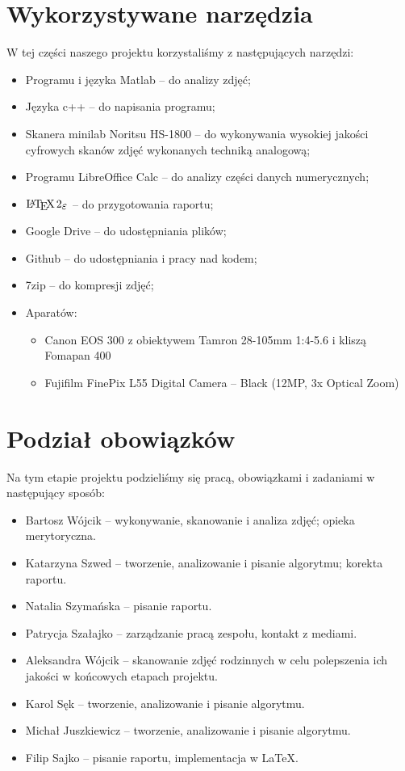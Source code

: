 \documentclass[]{mwart}
\begin{document}
\section{Wykorzystywane narzędzia}
W tej części naszego projektu korzystaliśmy z następujących narzędzi:
\begin{itemize}
    \item Programu i języka Matlab -- do analizy zdjęć;
    \item Języka c++ -- do napisania programu;
    \item Skanera minilab Noritsu HS-1800 -- do wykonywania wysokiej jakości cyfrowych skanów zdjęć wykonanych techniką analogową;
    \item Programu LibreOffice Calc -- do analizy części danych numerycznych;
    \item $\LaTeXe{}$ -- do przygotowania raportu;
    \item Google Drive -- do udostępniania plików;
    \item Github -- do udostępniania i pracy nad kodem;
    \item 7zip -- do kompresji zdjęć;
    \item Aparatów:
          \begin{itemize}
              \item Canon EOS 300 z obiektywem Tamron 28-105mm 1:4-5.6 i kliszą Fomapan 400
              \item Fujifilm FinePix L55 Digital Camera -- Black (12MP, 3x Optical Zoom)
          \end{itemize}
\end{itemize}


\section{Podział obowiązków}
Na tym etapie projektu podzieliśmy się pracą, obowiązkami i zadaniami w następujący sposób:
\begin{itemize}
    \item Bartosz Wójcik -- wykonywanie, skanowanie i analiza zdjęć; opieka merytoryczna.
    \item Katarzyna Szwed -- tworzenie, analizowanie i pisanie algorytmu; korekta raportu.
    \item Natalia Szymańska -- pisanie raportu.
    \item Patrycja Szałajko -- zarządzanie pracą zespołu, kontakt z mediami.
    \item Aleksandra Wójcik -- skanowanie zdjęć rodzinnych w celu polepszenia ich jakości w końcowych etapach projektu.
    \item Karol Sęk -- tworzenie, analizowanie i pisanie algorytmu.
    \item Michał Juszkiewicz -- tworzenie, analizowanie i pisanie algorytmu.
    \item Filip Sajko -- pisanie raportu, implementacja w \LaTeX{}.
\end{itemize}
\end{document}
